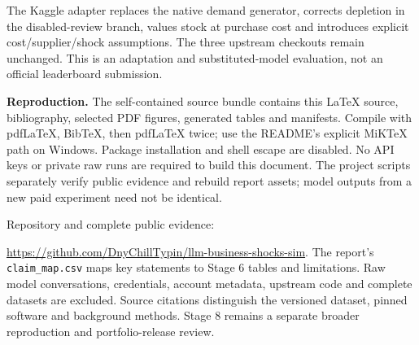\documentclass[11pt,a4paper]{article}
\newcommand{\repo}{\url{https://github.com/DnyChillTypin/llm-business-shocks-sim}}
\begin{document}
The Kaggle adapter replaces the native demand generator, corrects depletion in the disabled-review branch, values stock at purchase cost and introduces explicit cost/supplier/shock assumptions. The three upstream checkouts remain unchanged. This is an adaptation and substituted-model evaluation, not an official leaderboard submission.

\begin{center}\footnotesize
{}\end{center}

\textbf{Reproduction.} The self-contained source bundle contains this LaTeX source, bibliography, selected PDF figures, generated tables and manifests. Compile with pdfLaTeX, BibTeX, then pdfLaTeX twice; use the README's explicit MiKTeX path on Windows. Package installation and shell escape are disabled. No API keys or private raw runs are required to build this document. The project scripts separately verify public evidence and rebuild report assets; model outputs from a new paid experiment need not be identical.

Repository and complete public evidence:\par\repo. The report's \texttt{claim\_map.csv} maps key statements to Stage 6 tables and limitations. Raw model conversations, credentials, account metadata, upstream code and complete datasets are excluded. Source citations distinguish the versioned dataset, pinned software and background methods. Stage 8 remains a separate broader reproduction and portfolio-release review.
\end{document}
